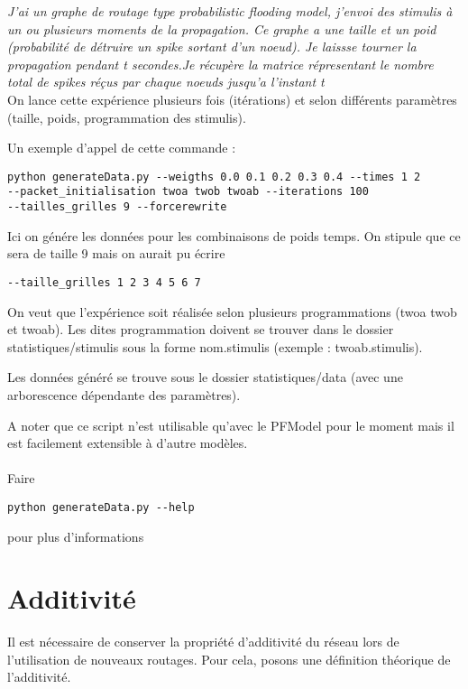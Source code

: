 \documentclass{report}
\begin{document}
\textit{J'ai un graphe de routage type probabilistic flooding model, j'envoi des stimulis à un ou plusieurs moments de la propagation. Ce graphe a une taille et un poid (probabilité de détruire un spike sortant d'un noeud). Je laissse tourner la propagation pendant t secondes.Je récupère la matrice répresentant le nombre total de spikes réçus par chaque noeuds jusqu'a l'instant t}\\

On lance cette expérience plusieurs fois (itérations) et selon différents paramètres (taille, poids, programmation des stimulis).

Un exemple d'appel de cette commande :
\begin{verbatim}
python generateData.py --weigths 0.0 0.1 0.2 0.3 0.4 --times 1 2 
--packet_initialisation twoa twob twoab --iterations 100 
--tailles_grilles 9 --forcerewrite
\end{verbatim}

Ici on génére les données pour les combinaisons de poids temps. On stipule que ce sera de 
taille 9 mais on aurait pu écrire 
\begin{verbatim} 
--taille_grilles 1 2 3 4 5 6 7
\end{verbatim}


On veut que l'expérience soit réalisée selon plusieurs programmations (twoa twob et twoab). Les dites programmation doivent se trouver dans le dossier statistiques/stimulis sous la forme nom.stimulis (exemple : twoab.stimulis).

Les données généré se trouve sous le dossier statistiques/data (avec une arborescence dépendante des paramètres).

A noter que ce script n'est utilisable qu'avec le PFModel pour le moment mais il est facilement extensible à d'autre modèles.\\\\
Faire
\begin{verbatim}
python generateData.py --help
\end{verbatim}
pour plus d'informations


\part{Additivité}

Il est nécessaire de conserver la propriété d'additivité du réseau lors de l'utilisation de nouveaux routages. Pour cela, posons une définition théorique de l'additivité.
\end{document}
